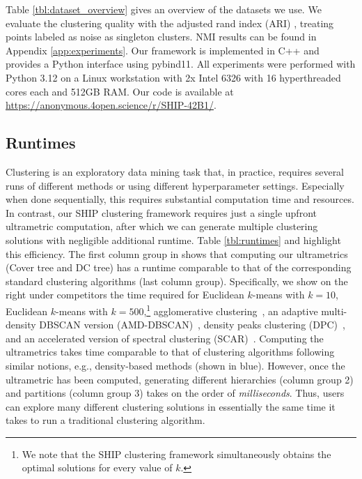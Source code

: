 Table \ref{tbl:dataset_overview} gives an overview of the datasets we use. We evaluate the clustering quality with the adjusted rand index (ARI) \citep{ari}, treating points labeled as noise as singleton clusters. NMI \citep{nmi} results can be found in Appendix \ref{app:experiments}.
Our framework is implemented in C++ and provides a Python interface using pybind11. All experiments were performed with Python 3.12 on a Linux workstation with 2x Intel 6326 with 16 hyperthreaded cores each and 512GB RAM. Our code is available at \url{https://anonymous.4open.science/r/SHIP-42B1/}.

\subsection{Runtimes}\label{ssec:runtime}

Clustering is an exploratory data mining task that, in practice, requires several runs of different methods or using different hyperparameter settings. Especially when done sequentially, this requires substantial computation time and resources.
In contrast, our SHIP clustering framework requires just a single upfront ultrametric computation, after which we can generate multiple clustering solutions with negligible additional runtime.
Table \ref{tbl:runtimes} and  highlight this efficiency. The first column group in  shows that computing our ultrametrics (Cover tree and DC tree) has a runtime comparable to that of the corresponding standard clustering algorithms (last column group). 
Specifically, we show on the right under competitors the time required for Euclidean $k$-means with $k=10$, Euclidean $k$-means with $k=500$,\footnote{We note that the SHIP clustering framework simultaneously obtains the optimal solutions for every value of $k$.} agglomerative clustering~\cite{hierarchical_clustering_og}, an adaptive multi-density DBSCAN version (AMD-DBSCAN)~\cite{Wang2022AMDDBSCANAA}, density peaks clustering (DPC)~\cite{density-peaks}, and an accelerated version of spectral clustering (SCAR)~\cite{hohma2022scar}. 
Computing the ultrametrics takes time comparable to that of clustering algorithms following similar notions, e.g., density-based methods (shown in blue).
However, once the ultrametric has been computed, generating different hierarchies (column group 2) and partitions (column group 3) takes on the order of \emph{milliseconds}. Thus, users can explore many different clustering solutions in essentially the same time it takes to run a traditional clustering algorithm.



